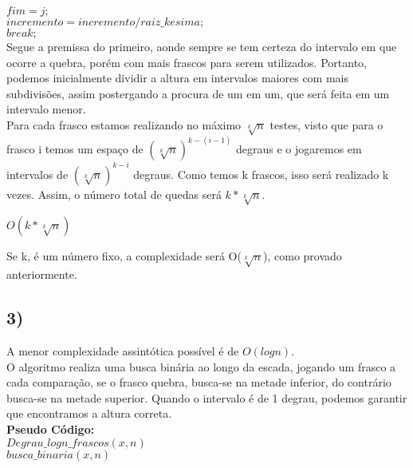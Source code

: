 \documentclass[10pt,a4paper]{article}
\begin{document}
	\hspace{4cm}$fim = j;$\\
	
	\hspace{4cm}$incremento = incremento/raiz\_kesima;$\\
	
	\hspace{4cm}$break;$\\
	
	
	Segue a premissa do primeiro, aonde sempre se tem certeza do intervalo em que ocorre a quebra, porém com mais frascos para serem utilizados. Portanto, podemos inicialmente dividir a altura em intervalos maiores com mais subdivisões, assim postergando a procura de um em um, que será feita em um intervalo menor.\\
	
	Para cada frasco estamos realizando no máximo $\sqrt[k]{n}$ testes, visto que para o frasco i temos um espaço de $(\sqrt[k]{n})^{k-(i-1)}$ degraus e o jogaremos em intervalos de $(\sqrt[k]{n})^{k-i}$ degraus. Como temos k frascos, isso será realizado k vezes. Assim, o número total de quedas será $k * \sqrt[k]{n}$.\\
	
	\begin{center}
	
		$O(k*\sqrt[k]{n})$\\
	\end{center}
	
	Se k, é um número fixo, a complexidade será O($\sqrt[k]{n}$), como provado anteriormente.\\
	
	
	\subsection*{3)}
	
	\vspace{0.5cm}
	
	\tab A menor complexidade assintótica possível é de $O(log n)$.\\

O algoritmo realiza uma busca binária ao longo da escada, jogando um frasco a cada comparação, se o frasco quebra, busca-se na metade inferior, do contrário busca-se na metade superior. Quando o intervalo é de 1 degrau, podemos garantir que encontramos a altura correta.\\


\textbf{Pseudo Código: }\\

$Degrau\_logn\_frascos(x,n)$\\
					

	\hspace{1cm}$busca\_binaria(x,n)$

	
\end{document}
